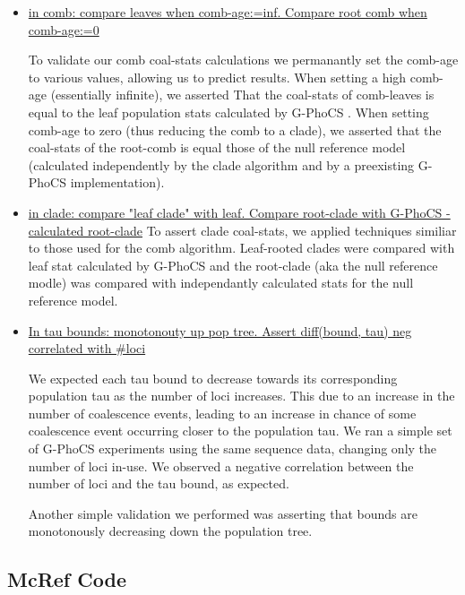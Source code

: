 \documentclass[11pt]{article}
\newcommand{\1}{\mathbbm{1}}
\newcommand{\gp}{G-PhoCS }
\begin{document}
\begin{itemize}

\item \underline{in comb: compare leaves when comb-age:=inf. Compare root comb when comb-age:=0}

To validate our comb coal-stats calculations we permanantly set the comb-age to various values, allowing us to predict results. When setting a high comb-age (essentially infinite), we asserted That the coal-stats of comb-leaves is equal to the leaf population stats calculated by \gp. When setting comb-age to zero (thus reducing the comb to a clade), we asserted that the coal-stats of the root-comb is equal those of the null reference model (calculated independently by the clade algorithm and by a preexisting \gp implementation).



\item \underline{in clade: compare "leaf clade" with leaf. Compare root-clade with \gp -calculated root-clade}
To assert clade coal-stats, we applied techniques similiar to those used for the comb algorithm. Leaf-rooted clades were compared with leaf stat calculated by \gp and the root-clade (aka the null reference modle) was compared with independantly calculated stats for the null reference model. 

\item \underline{In tau bounds: monotonouty up pop tree. Assert diff(bound, tau) neg correlated with \#loci}

We expected each tau bound to decrease towards its corresponding population tau as the number of loci increases. This due to an increase in the number of coalescence events, leading to an increase in chance of some coalescence event occurring closer to the population tau. We ran a simple set of \gp experiments using the same sequence data, changing only the number of loci in-use. We observed a negative correlation between the number of loci and the tau bound, as expected.

Another simple validation we performed was asserting that bounds are monotonously decreasing down the population tree.

\end{itemize}

\subsection{McRef Code}
\end{document}
